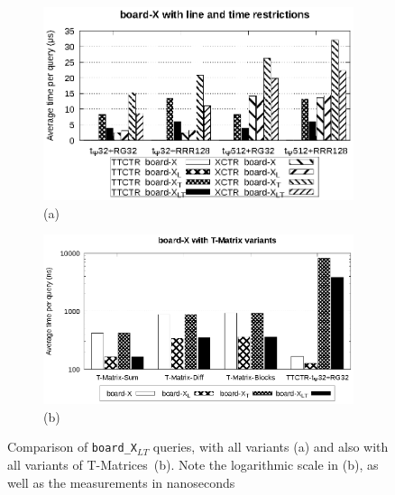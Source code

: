\documentclass[runningheads]{llncs}
\newcommand{\acumm}{T-Matrices} %
\begin{document}
\begin{figure}[hbt!]
\begin{subfigure}{0.5\linewidth}
\includegraphics[width=\linewidth]{experiments/board.eps}
\vspace{-12pt}
\caption{\footnotesize (a)}
\vspace{-12pt}
\end{subfigure}%
\begin{subfigure}{0.5\linewidth}
\includegraphics[width=\linewidth]{experiments/board_t.eps}
\vspace{-12pt}
\caption{\footnotesize (b)}
\vspace{-12pt}
\end{subfigure}
\caption{Comparison of \texttt{board\_X$_{LT}$} queries, with all variants (a) and also with all variants of \acumm~(b). Note the logarithmic scale in (b), as well as the measurements in nanoseconds}
\label{fig:board}
\end{figure}
\end{document}
